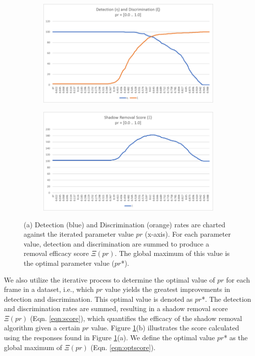 \begin{figure}
  \centering
  \begin{subfigure}{.8\linewidth}
  	\includegraphics[width=1\linewidth]{figures/campus_dd.jpg}
  \caption{}
  \end{subfigure}
  \hfill
  \begin{subfigure}{.8\linewidth}
  	\includegraphics[width=1\linewidth]{figures/campus_score.jpg}
  \caption{}
  \end{subfigure}
\caption{(a) Detection (blue) and Discrimination (orange) rates are charted against the iterated parameter value $pr$ (x-axis). For each parameter value, detection and discrimination are summed to produce a removal efficacy score $\Xi(pr)$. The global maximum of this value is the optimal parameter value ($pr$*).}
\label{fig:campusddscore}
\end{figure}

We also utilize the iterative process to determine the optimal value of $pr$ for each frame in a dataset, i.e., which $pr$ value yields the greatest improvements in detection and discrimination. This optimal value is denoted as $pr$*. The detection and discrimination rates are summed, resulting in a shadow removal score $\Xi(pr)$ (Eqn. \ref{eqn:score}), which quantifies the efficacy of the shadow removal algorithm given a certain $pr$ value. Figure \ref{fig:campusddscore}(b) illustrates the score calculated using the responses found in Figure \ref{fig:campusddscore}(a). We define the optimal value $pr$* as the global maximum of $\Xi(pr)$ (Eqn. \ref{eqn:optscore}).

